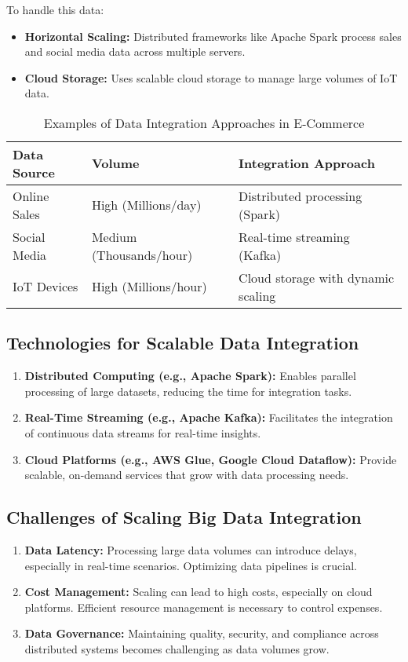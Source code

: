 \documentclass[12pt]{article}
\begin{document}
To handle this data:
\begin{itemize}
    \item \textbf{Horizontal Scaling:} Distributed frameworks like Apache Spark process sales and social media data across multiple servers.
    \item \textbf{Cloud Storage:} Uses scalable cloud storage to manage large volumes of IoT data.
\end{itemize}

\begin{table}[H]
    \centering
    \begin{tabular}{|p{4cm}|p{4cm}|p{6cm}|}
        \hline
        \textbf{Data Source} & \textbf{Volume} & \textbf{Integration Approach} \\ \hline
        Online Sales & High (Millions/day) & Distributed processing (Spark) \\ \hline
        Social Media & Medium (Thousands/hour) & Real-time streaming (Kafka) \\ \hline
        IoT Devices & High (Millions/hour) & Cloud storage with dynamic scaling \\ \hline
    \end{tabular}
    \caption{Examples of Data Integration Approaches in E-Commerce}
\end{table}

\subsection{Technologies for Scalable Data Integration}
\begin{enumerate}
    \item \textbf{Distributed Computing (e.g., Apache Spark):} Enables parallel processing of large datasets, reducing the time for integration tasks.
    \item \textbf{Real-Time Streaming (e.g., Apache Kafka):} Facilitates the integration of continuous data streams for real-time insights.
    \item \textbf{Cloud Platforms (e.g., AWS Glue, Google Cloud Dataflow):} Provide scalable, on-demand services that grow with data processing needs.
\end{enumerate}

\subsection{Challenges of Scaling Big Data Integration}
\begin{enumerate}
    \item \textbf{Data Latency:} Processing large data volumes can introduce delays, especially in real-time scenarios. Optimizing data pipelines is crucial.
    \item \textbf{Cost Management:} Scaling can lead to high costs, especially on cloud platforms. Efficient resource management is necessary to control expenses.
    \item \textbf{Data Governance:} Maintaining quality, security, and compliance across distributed systems becomes challenging as data volumes grow.
\end{enumerate}
\end{document}
